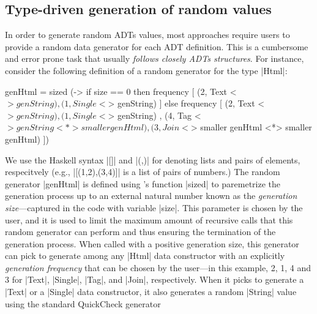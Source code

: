 

\subsection{Type-driven generation of random values}

In order to generate random ADTs values, most approaches require users to provide
a random data generator for each ADT definition.
%
This is a cumbersome and error prone task that usually \emph{follows closely
  ADTs structures}.
%
For instance, consider the following definition of a \quickcheck random
generator for the type |Html|:
%
\begin{code}
genHtml = sized (\size ->
  if size == 0
  then frequency
  [  (2,  Text    <$> genString)
  ,  (1,  Single  <$> genString) ]
  else frequency
  [  (2,  Text    <$> genString)
  ,  (1,  Single  <$> genString)
  ,  (4,  Tag     <$> genString <*> smaller genHtml)
  ,  (3,  Join    <$> smaller genHtml <*> smaller genHtml) ])
\end{code} %
%
We use the Haskell syntax |[]| and |(,)| for denoting lists and pairs of
elements, respecitvely (e.g., |[(1,2),(3,4)]| is a list of pairs of numbers.)
%
The random generator |genHtml| is defined using \quickcheck's function |sized|
to paremetrize the generation process up to an external natural number known as
the \emph{generation size}---captured in the code with variable |size|.
%
This parameter is chosen by the user, and it is used to limit the maximum amount
of recursive calls that this random generator can perform and thus ensuring
the termination of the generation process.
%
When called with a positive generation size, this generator can pick to generate
among any |Html| data constructor with an explicitly \emph{generation frequency}
that can be chosen by the user---in this example, 2, 1, 4 and 3 for |Text|,
|Single|, |Tag|, and |Join|, respectively.
%
When it picks to generate a |Text| or a |Single| data constructor, it also
generates a random |String| value using the standard QuickCheck generator
